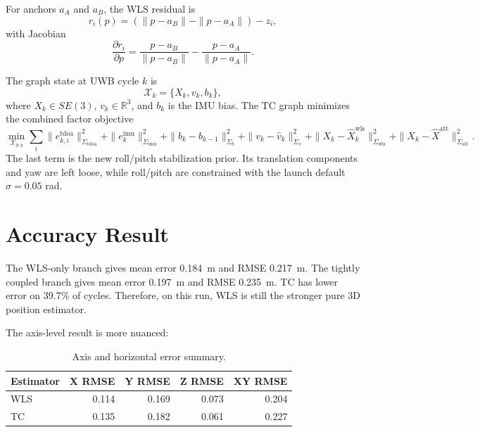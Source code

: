 \documentclass[11pt,a4paper]{article}
\begin{document}
For anchors \(a_A\) and \(a_B\), the WLS residual is
\begin{equation}
  r_i(p) = \left(\|p-a_B\|-\|p-a_A\|\right)-z_i ,
\end{equation}
with Jacobian
\begin{equation}
  \frac{\partial r_i}{\partial p}
  =
  \frac{p-a_B}{\|p-a_B\|}
  -
  \frac{p-a_A}{\|p-a_A\|}.
\end{equation}

The graph state at UWB cycle \(k\) is
\begin{equation}
  \mathcal{X}_k = \{X_k, v_k, b_k\},
\end{equation}
where \(X_k\in SE(3)\), \(v_k\in\mathbb{R}^3\), and \(b_k\) is the IMU bias. The TC graph minimizes the combined factor objective
\begin{equation}
  \min_{\mathcal{X}_{0:k}}
  \sum_i \|e^{\mathrm{tdoa}}_{k,i}\|_{\Sigma_{\mathrm{tdoa}}}^2
  + \|e^{\mathrm{imu}}_k\|_{\Sigma_{\mathrm{imu}}}^2
  + \|b_k-b_{k-1}\|_{\Sigma_b}^2
  + \|v_k-\hat{v}_k\|_{\Sigma_v}^2
  + \|X_k-\hat{X}^{\mathrm{wls}}_k\|_{\Sigma_{\mathrm{wls}}}^2
  + \|X_k-\hat{X}^{\mathrm{att}}\|_{\Sigma_{\mathrm{att}}}^2 .
\end{equation}
The last term is the new roll/pitch stabilization prior. Its translation components and yaw are left loose, while roll/pitch are constrained with the launch default \(\sigma=0.05\) rad.

\section{Accuracy Result}

\begin{table}[H]
  \centering
  \caption{3D position error statistics in meters for the 260429 CSV.}
  
  \label{tab:metrics260429}
\end{table}

The WLS-only branch gives mean error \SI{0.184}{m} and RMSE \SI{0.217}{m}. The tightly coupled branch gives mean error \SI{0.197}{m} and RMSE \SI{0.235}{m}. TC has lower error on 39.7\% of cycles. Therefore, on this run, WLS is still the stronger pure 3D position estimator.

The axis-level result is more nuanced:

\begin{table}[H]
  \centering
  \caption{Axis and horizontal error summary.}
  \begin{tabular}{lrrrr}
    \toprule
    Estimator & X RMSE & Y RMSE & Z RMSE & XY RMSE \\
    \midrule
    WLS & 0.114 & 0.169 & 0.073 & 0.204 \\
    TC  & 0.135 & 0.182 & 0.061 & 0.227 \\
    \bottomrule
  \end{tabular}
  \label{tab:axis260429}
\end{table}
\end{document}
